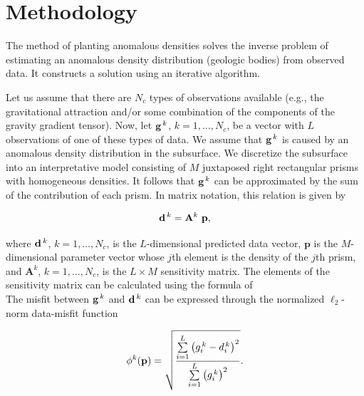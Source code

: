 \documentclass[twocolumn,final]{svjour3}
\newcommand{\vect}[1]{\mathbf{#1}}
\newcommand{\mat}[1]{\mathbf{#1}}
\begin{document}
\section{Methodology}

\begin{sloppypar}

The method of planting anomalous densities \citep{uieda_planting}
solves the inverse problem
of estimating an anomalous density distribution
(geologic bodies)
from observed data.
It constructs a solution
using an iterative algorithm.




Let us assume that there are $N_{c}$ types of observations available (e.g.,
the gravitational attraction and/or some combination of the components of the
gravity gradient tensor).
Now, let $\vect{g}^{\thinspace k}$, $k=1,\ldots,N_{c}$, be a vector with
$L$ observations of one of these types of data.
We assume that $\vect{g}^{\thinspace k}$ is caused by an anomalous density
distribution in the subsurface.
We discretize the subsurface into an interpretative model consisting of $M$
juxtaposed right rectangular prisms with homogeneous densities.
It follows that $\vect{g}^{\thinspace k}$ can be approximated by the sum of the
contribution of each prism.
In matrix notation, this relation is given by

\begin{equation}
    \vect{d}^{\thinspace k} = \mat{A}^{k}~\vect{p},
    \label{eq:forward}
\end{equation}

where $\vect{d}^{\thinspace k}$, $k=1,\ldots,N_{c}$, is the $L$-dimensional
predicted data vector,
$\vect{p}$ is the $M$-dimensional parameter vector whose $j$th element is the
density of the $j$th prism, and $\mat{A}^{k}$, $k=1,\ldots,N_{c}$, is the
$L \times M$ sensitivity matrix.
The elements of the sensitivity matrix can be calculated using the formula of
\\[0.2cm]
The misfit between $\vect{g}^{\thinspace k}$ and $\vect{d}^{\thinspace k}$ can
be expressed through the normalized $\ell_{2}$-norm data-misfit function

\begin{equation}
    \phi^{k}(\vect{p}) = \sqrt{
    \dfrac{
        \sum\limits_{i=1}^{L}
        \left( g_{i}^{\thinspace k} - d_{i}^{\thinspace k} \right)^{2}
    }{
        \sum\limits_{i=1}^{L}\left(g_{i}^{\thinspace k}\right)^{2}}}.
    \label{eq:phik}
\end{equation}


\end{sloppypar}
\end{document}
